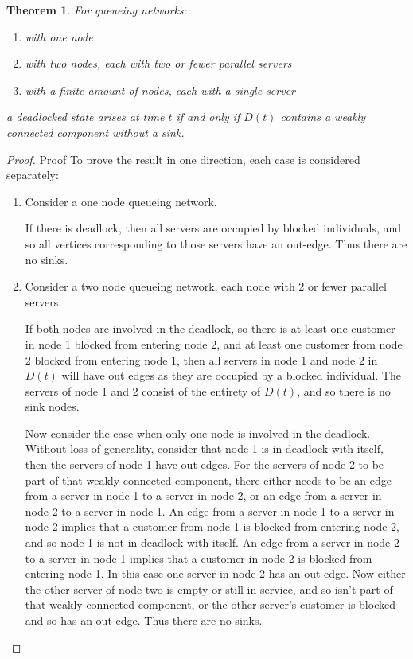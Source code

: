\documentclass{article}
\newtheorem{theorem}{Theorem}
\numberwithin{equation}{section}
\begin{document}
\begin{theorem}\label{thrm:wcc_nosink}
For queueing networks:
\begin{enumerate}
  \item with one node
  \item with two nodes, each with two or fewer parallel servers
  \item with a finite amount of nodes, each with a single-server
\end{enumerate}
a deadlocked state arises at time $t$ if and only if $D(t)$ contains a weakly
connected component without a sink.
\end{theorem}

\begin{proof}{Proof}
  To prove the result in one direction, each case is considered separately:

  \begin{enumerate}

  \item
  Consider a one node queueing network.

  If there is deadlock, then all servers are occupied by blocked individuals,
  and so all vertices corresponding to those servers have an out-edge.
  Thus there are no sinks.

  \item
  Consider a two node queueing network, each node with 2 or fewer parallel
  servers.

  If both nodes are involved in the deadlock, so there is at least one
  customer in node 1 blocked from entering node 2, and at least one customer
  from node 2 blocked from entering node 1, then all servers in node 1 and
  node 2 in $D(t)$ will have out edges as they are occupied by a blocked
  individual.
  The servers of node 1 and 2 consist of the entirety of $D(t)$, and so there
  is no sink nodes.

  Now consider the case when only one node is involved in the deadlock.
  Without loss of generality, consider that node 1 is in deadlock with itself,
  then the servers of node 1 have out-edges.
  For the servers of node 2 to be part of that weakly connected component,
  there either needs to be an edge from a server in node 1 to a server in node
  2, or an edge from a server in node 2 to a server in node 1.
  An edge from a server in node 1 to a server in node 2 implies that a
  customer from node 1 is blocked from entering node 2, and so node 1 is not
  in deadlock with itself.
  An edge from a server in node 2 to a server in node 1 implies that a
  customer in node 2 is blocked from entering node 1.
  In this case one server in node 2 has an out-edge.
  Now either the other server of node two is empty or still in service, and so
  isn't part of that weakly connected component, or the other server's
  customer is blocked and so has an out edge.
  Thus there are no sinks.


\end{enumerate}
\end{proof}
\end{document}
